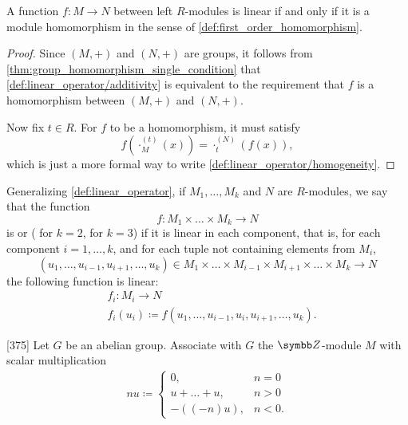 \begin{proposition}\label{thm:map_is_linear_iff_homomorphism}
  A function \( f: M \to N \) between left \( R \)-modules is linear if and only if it is a module homomorphism in the sense of \cref{def:first_order_homomorphism}.
\end{proposition}
\begin{proof}
  Since \( (M, +) \) and \( (N, +) \) are groups, it follows from \cref{thm:group_homomorphism_single_condition} that \ref{def:linear_operator/additivity} is equivalent to the requirement that \( f \) is a homomorphism between \( (M, +) \) and \( (N, +) \).

  Now fix \( t \in R \). For \( f \) to be a homomorphism, it must satisfy
  \begin{equation*}
    f(\cdot_M^{(t)}(x)) = \cdot_t^{(N)}(f(x)),
  \end{equation*}
  which is just a more formal way to write \ref{def:linear_operator/homogeneity}.
\end{proof}

\begin{definition}\label{def:multilinear_function}
  Generalizing \cref{def:linear_operator}, if \( M_1, \ldots, M_k \) and \( N \) are \( R \)-modules, we say that the function
  \begin{equation*}
    f: M_1 \times \ldots \times M_k \to N
  \end{equation*}
  is  or  ( for \( k = 2 \),  for \( k = 3 \)) if it is linear in each component, that is, for each component \( i = 1, \ldots, k \), and for each tuple not containing elements from \( M_i \),
  \begin{equation*}
    (u_1, \ldots, u_{i-1}, u_{i+1}, \ldots, u_k) \in M_1 \times \ldots \times M_{i-1} \times M_{i+1} \times \ldots \times M_k \to N
  \end{equation*}
  the following function is linear:
  \begin{align*}
    &f_i: M_i \to N \\
    &f_i(u_i) \coloneqq f(u_1, \ldots, u_{i-1}, u_i, u_{i+1}, \ldots, u_k).
  \end{align*}
\end{definition}

\begin{definition}\label{def:abelian_group_z_module}\cite{Knapp2016BAlg}[375]
  Let \( G \) be an abelian group. Associate with \( G \) the \( \Z \)-module \( M \) with scalar multiplication
  \begin{align*}
    nu \coloneqq \begin{cases}
      0, &n = 0 \\
      u + \ldots + u, &n > 0 \\
      -((-n)u), &n < 0.
    \end{cases}
  \end{align*}
\end{definition}

